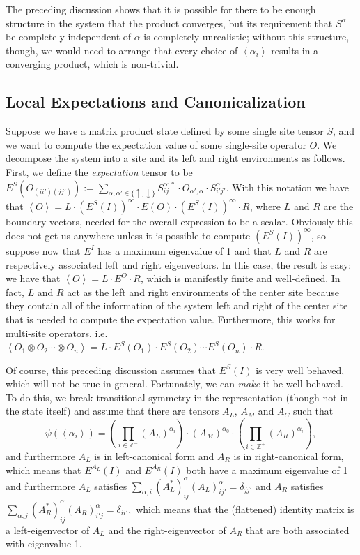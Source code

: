 \documentclass{article}
\newcommand{\paren}[1]{\left(#1\right)}
\newcommand{\seq}[1]{\left<#1\right>}
\newcommand{\expect}[1]{\left<#1\right>}
\newcommand{\Z}{\mathbb{Z}}
\begin{document}
The preceding discussion shows that it is possible for there to be enough structure in the system that the product converges, but its requirement that $S^\alpha$ be completely independent of $\alpha$ is completely unrealistic;  without this structure, though, we would need to arrange that every choice of $\seq{\alpha_i}$ results in a converging product, which is non-trivial.

\subsection{Local Expectations and Canonicalization}

Suppose we have a matrix product state defined by some single site tensor $S$, and we want to compute the expectation value of some single-site operator $O$.  We decompose the system into a site and its left and right environments as follows.  First, we define the \emph{expectation} tensor to be $E^S(O_{(ii')(jj')}):=\sum_{\alpha,\alpha'\in\{\uparrow,\downarrow\}}S^{\alpha'*}_{ij}\cdot O_{\alpha',\alpha}\cdot S^\alpha_{i'j'}.$  With this notation we have that $\expect{O}=L\cdot (E^S(I))^\infty\cdot E(O)\cdot(E^S(I))^\infty\cdot R$, where $L$ and $R$ are the boundary vectors, needed for the overall expression to be a scalar.  Obviously this does not get us anywhere unless it is possible to compute $(E^S(I))^\infty$, so suppose now that $E^I$ has a maximum eigenvalue of 1 and that $L$ and $R$ are respectively associated left and right eigenvectors.  In this case, the result is easy:  we have that $\expect{O}=L\cdot E^O\cdot R$, which is manifestly finite and well-defined.  In fact, $L$ and $R$ act as the left and right environments of the center site because they contain all of the information of the system left and right of the center site that is needed to compute the expectation value.  Furthermore, this works for multi-site operators, i.e. $\expect{O_1\otimes O_2\cdots\otimes O_n} = L\cdot E^S(O_1)\cdot E^S(O_2)\cdots E^S(O_n)\cdot R$.

Of course, this preceding discussion assumes that $E^S(I)$ is very well behaved, which will not be true in general.  Fortunately, we can \emph{make} it be well behaved.  To do this, we break transitional symmetry in the representation (though not in the state itself) and assume that there are tensors $A_L$, $A_M$ and $A_C$ such that \begin{equation}
\label{eq:newform}
\psi(\seq{\alpha_i}) = \paren{\prod_{i\in\Z^-}(A_L)^{\alpha_i}}\cdot (A_M)^{\alpha_0}\cdot \paren{\prod_{i\in\Z^+}(A_R)^{\alpha_i}},\end{equation}
and furthermore $A_L$ is in left-canonical form and $A_R$ is in right-canonical form, which means that $E^{A_L}(I)$ and $E^{A_R}(I)$ both have a maximum eigenvalue of 1 and furthermore $A_L$ satisfies $\sum_{\alpha,i}(A_L^*)^{\alpha}_{ij}(A_L)^{\alpha}_{ij'}=\delta_{jj'}$ and $A_R$ satisfies $\sum_{\alpha,j}(A_R^*)^{\alpha}_{ij}(A_R)^{\alpha}_{i'j}=\delta_{ii'},$  which means that the (flattened) identity matrix is a left-eigenvector of $A_L$ and the right-eigenvector of $A_R$ that are both associated with eigenvalue 1.
\end{document}

